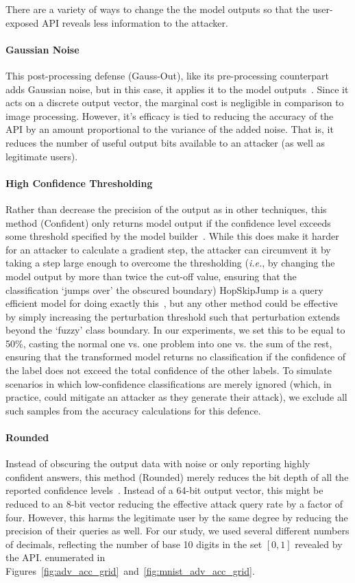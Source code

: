 \documentclass[journal]{IEEEtran}
\newcommand{\ie}{\textit{i.e.}\xspace}
\begin{document}
There are a variety of ways to change the the model outputs so that the user-exposed API reveals less information to the attacker.

\paragraph{Gaussian Noise}
This post-processing defense (Gauss-Out), like its pre-processing counterpart adds Gaussian noise, but in this case, it applies it to the model outputs~\cite{gauss_out}. Since it acts on a discrete output vector, the marginal cost is negligible in comparison to image processing. However, it's efficacy is tied to reducing the accuracy of the API by an amount proportional to the variance of the added noise. That is, it reduces the number of useful output bits available to an attacker (as well as legitimate users).

\paragraph{High Confidence Thresholding}
Rather than decrease the precision of the output as in other techniques, this method (Confident) only returns model output if the confidence level exceeds some threshold specified by the model builder~\cite{high_conf}. While this does make it harder for an attacker to calculate a gradient step, the attacker can circumvent it by taking a step large enough to overcome the thresholding (\ie, by changing the model output by more than twice the cut-off value, ensuring that the classification `jumps over' the obscured boundary) HopSkipJump is a query efficient model for doing exactly this~\cite{hopskipjump}, but any other method could be effective by simply increasing the perturbation threshold such that perturbation extends beyond the `fuzzy' class boundary. In our experiments, we set this to be equal to 50\%, casting the normal one vs. one problem into one vs. the sum of the rest, ensuring that the transformed model returns no classification if the confidence of the label does not exceed the total confidence of the other labels. To simulate scenarios in which low-confidence classifications are merely ignored (which, in practice, could mitigate an attacker as they generate their attack), we exclude all such samples from the accuracy calculations for this defence. 

\paragraph{Rounded}
Instead of obscuring the output data with noise or only reporting highly confident answers, this method (Rounded) merely reduces the bit depth of all the reported confidence levels~\cite{discretization}. Instead of a 64-bit output vector, this might be reduced to an 8-bit vector reducing the effective attack query rate by a factor of four. However, this harms the legitimate user by the same degree by reducing the precision of their queries as well. For our study, we used several different numbers of decimals, reflecting the number of base 10 digits in the set $[0,1]$ revealed by the API. enumerated in Figures~\ref{fig:adv_acc_grid}~and~\ref{fig:mnist_adv_acc_grid}. 
\end{document}
